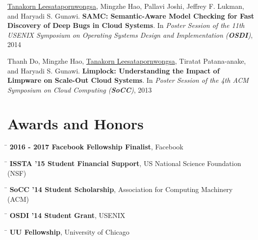 \documentclass[10pt]{article} %
\begin{document}
\underline{Tanakorn Leesatapornwongsa,} Mingzhe Hao, Pallavi Joshi, Jeffrey F.
Lukman, and Haryadi S. Gunawi. \textbf{SAMC: Semantic-Aware Model Checking for
Fast Discovery of Deep Bugs in Cloud Systems}. In \textit{Poster Session of the
11th USENIX Symposium on Operating Systems Design and Implementation (\textbf{OSDI})},
2014
\vspace{2mm}

Thanh Do, Mingzhe Hao, \underline{Tanakorn Leesatapornwongsa}, Tiratat
Patana-anake, and Haryadi S. Gunawi. \textbf{Limplock: Understanding the Impact
of Limpware on Scale-Out Cloud Systems}. In \textit{Poster Session of the 4th ACM
Symposium on Cloud Computing (\textbf{SoCC})}, 2013


\section{Awards and Honors}

\begin{tabbing}
\hspace{2.5cm} \=  \> \textbf{2016 - 2017 Facebook Fellowship Finalist}, Facebook
\end{tabbing}

\begin{tabbing}
\hspace{2.5cm} \=  \> \textbf{ISSTA '15 Student Financial Support}, US National Science Foundation (NSF)
\end{tabbing}

\begin{tabbing}
\hspace{2.5cm} \=  \> \textbf{SoCC '14 Student Scholarship}, Association for Computing Machinery (ACM)
\end{tabbing}

\begin{tabbing}
\hspace{2.5cm} \=  \> \textbf{OSDI '14 Student Grant}, USENIX
\end{tabbing}

\begin{tabbing}
\hspace{2.5cm} \=  \> \textbf{UU Fellowship}, University of Chicago
\end{tabbing}
\end{document}
